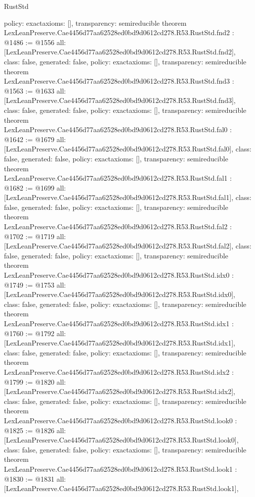 \begin{lexlean}{RustStd}
\begin{coremodule}
{  policy: exact{axioms: []},
  transparency: semireducible
}
theorem LexLeanPreserve.Cae4456d77aa62528ed0bd9d0612cd278.R53.RustStd.fnd2 : @1486 := @1556 {
  all: [LexLeanPreserve.Cae4456d77aa62528ed0bd9d0612cd278.R53.RustStd.fnd2],
  class: false,
  generated: false,
  policy: exact{axioms: []},
  transparency: semireducible
}
theorem LexLeanPreserve.Cae4456d77aa62528ed0bd9d0612cd278.R53.RustStd.fnd3 : @1563 := @1633 {
  all: [LexLeanPreserve.Cae4456d77aa62528ed0bd9d0612cd278.R53.RustStd.fnd3],
  class: false,
  generated: false,
  policy: exact{axioms: []},
  transparency: semireducible
}
theorem LexLeanPreserve.Cae4456d77aa62528ed0bd9d0612cd278.R53.RustStd.fal0 : @1642 := @1679 {
  all: [LexLeanPreserve.Cae4456d77aa62528ed0bd9d0612cd278.R53.RustStd.fal0],
  class: false,
  generated: false,
  policy: exact{axioms: []},
  transparency: semireducible
}
theorem LexLeanPreserve.Cae4456d77aa62528ed0bd9d0612cd278.R53.RustStd.fal1 : @1682 := @1699 {
  all: [LexLeanPreserve.Cae4456d77aa62528ed0bd9d0612cd278.R53.RustStd.fal1],
  class: false,
  generated: false,
  policy: exact{axioms: []},
  transparency: semireducible
}
theorem LexLeanPreserve.Cae4456d77aa62528ed0bd9d0612cd278.R53.RustStd.fal2 : @1702 := @1719 {
  all: [LexLeanPreserve.Cae4456d77aa62528ed0bd9d0612cd278.R53.RustStd.fal2],
  class: false,
  generated: false,
  policy: exact{axioms: []},
  transparency: semireducible
}
theorem LexLeanPreserve.Cae4456d77aa62528ed0bd9d0612cd278.R53.RustStd.idx0 : @1749 := @1753 {
  all: [LexLeanPreserve.Cae4456d77aa62528ed0bd9d0612cd278.R53.RustStd.idx0],
  class: false,
  generated: false,
  policy: exact{axioms: []},
  transparency: semireducible
}
theorem LexLeanPreserve.Cae4456d77aa62528ed0bd9d0612cd278.R53.RustStd.idx1 : @1760 := @1792 {
  all: [LexLeanPreserve.Cae4456d77aa62528ed0bd9d0612cd278.R53.RustStd.idx1],
  class: false,
  generated: false,
  policy: exact{axioms: []},
  transparency: semireducible
}
theorem LexLeanPreserve.Cae4456d77aa62528ed0bd9d0612cd278.R53.RustStd.idx2 : @1799 := @1820 {
  all: [LexLeanPreserve.Cae4456d77aa62528ed0bd9d0612cd278.R53.RustStd.idx2],
  class: false,
  generated: false,
  policy: exact{axioms: []},
  transparency: semireducible
}
theorem LexLeanPreserve.Cae4456d77aa62528ed0bd9d0612cd278.R53.RustStd.look0 : @1825 := @1826 {
  all: [LexLeanPreserve.Cae4456d77aa62528ed0bd9d0612cd278.R53.RustStd.look0],
  class: false,
  generated: false,
  policy: exact{axioms: []},
  transparency: semireducible
}
theorem LexLeanPreserve.Cae4456d77aa62528ed0bd9d0612cd278.R53.RustStd.look1 : @1830 := @1831 {
  all: [LexLeanPreserve.Cae4456d77aa62528ed0bd9d0612cd278.R53.RustStd.look1],
}
\end{coremodule}
\end{lexlean}
